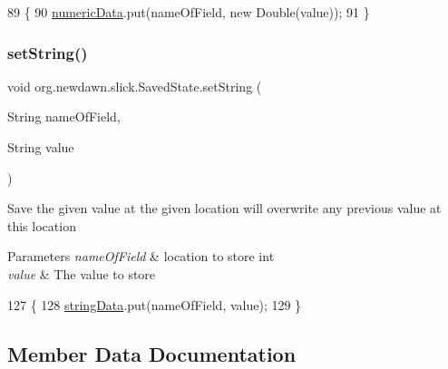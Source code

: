\begin{DoxyCode}
89                                                            \{
90         \mbox{\hyperlink{classorg_1_1newdawn_1_1slick_1_1_saved_state_ad734be75c78cdbd06ed020c7d416e187}{numericData}}.put(nameOfField, \textcolor{keyword}{new} Double(value));
91     \}
\end{DoxyCode}
\mbox{\label{classorg_1_1newdawn_1_1slick_1_1_saved_state_a28ee41003a982243b0ebf820a169ff90}} 
\subsubsection{\texorpdfstring{set\+String()}{setString()}}
{\footnotesize\ttfamily void org.\+newdawn.\+slick.\+Saved\+State.\+set\+String (\begin{DoxyParamCaption}\item[{String}]{name\+Of\+Field,  }\item[{String}]{value }\end{DoxyParamCaption})\hspace{0.3cm}{\ttfamily [inline]}}

Save the given value at the given location will overwrite any previous value at this location


\begin{DoxyParams}{Parameters}
{\em name\+Of\+Field} & location to store int \\
\hline
{\em value} & The value to store \\
\hline
\end{DoxyParams}

\begin{DoxyCode}
127                                                            \{
128         \mbox{\hyperlink{classorg_1_1newdawn_1_1slick_1_1_saved_state_a5c7e1053721ddfee0b4a2a29facd103b}{stringData}}.put(nameOfField, value);
129     \}
\end{DoxyCode}


\subsection{Member Data Documentation}
\mbox{\label{classorg_1_1newdawn_1_1slick_1_1_saved_state_ace5c7436bfdba5164f2b1826bb173388}} 
